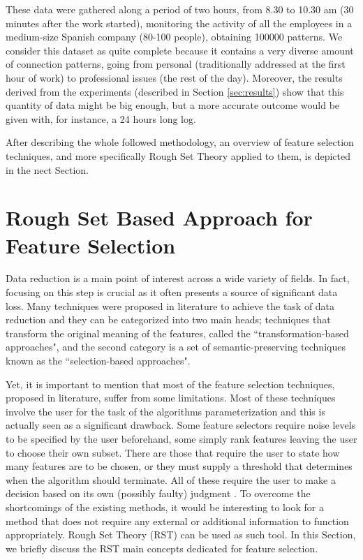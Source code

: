 \documentclass{llncs}
\begin{document}
These data were gathered along a period of two hours, from 8.30 to
10.30 am (30 minutes after the work started), monitoring the activity
of all the employees in a medium-size Spanish company (80-100 people),
obtaining 100000 patterns. We consider this dataset as quite complete because it contains a very diverse amount of connection patterns, going from personal (traditionally addressed at the first hour of work) to professional issues (the rest of the day).
Moreover, the results derived from the experiments (described in Section \ref{sec:results}) show that this quantity of data might be big enough, but a more accurate outcome would be given with, for instance, a 24 hours long log.

After describing the whole followed methodology, an overview of feature selection techniques, and more specifically Rough Set Theory applied to them, is depicted in the nect Section.

%
\section{Rough Set Based Approach for Feature Selection}
\label{sec:featureselection}

Data reduction is a main point of interest across a wide variety of fields. In fact, focusing on this step is crucial as it often presents a source of significant data loss. Many techniques were proposed in literature to achieve the task of data reduction and they can be categorized into two main heads; techniques that transform the original meaning of the features, called the ``transformation-based approaches", and the second category is a set of semantic-preserving techniques known as the ``selection-based approaches".

Yet, it is important to mention that most of the feature selection techniques, proposed in literature, suffer from some limitations. Most of these techniques involve the user for the task of the algorithms parameterization and this is actually seen as a significant drawback. Some feature selectors require noise levels to be specified by the user beforehand, some simply rank features leaving the user to choose their own subset. There are those that require the user to state how many features are to be chosen, or they must supply a threshold that determines when the algorithm should terminate. All of these require the user to make a decision based on its own (possibly faulty) judgment \cite{jensen2005semantics}. To overcome the shortcomings of the existing methods, it would be interesting to look for a method that does not require any external or additional information to function appropriately. Rough Set Theory (RST) \cite{pawlak2008rough} can be used as such tool. In this Section, we briefly discuss the RST main concepts dedicated for feature selection.
\end{document}
